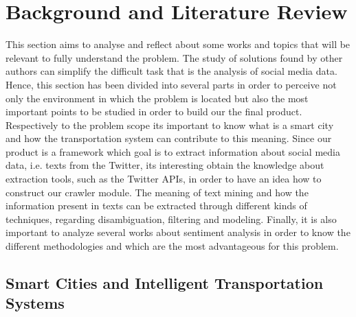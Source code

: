 \chapter{Background and Literature Review} \label{chap:sota}

\minitoc \mtcskip \noindent

This section aims to analyse and reflect about some works and topics that will be relevant to fully understand the problem. The study of solutions found by other authors can simplify the difficult task that is the analysis of social media data.
Hence, this section has been divided into several parts in order to perceive not only the environment in which the problem is located but also the most important points to be studied in order to build our the final product. Respectively to the problem scope its important to know what is a smart city and how the transportation system can contribute to this meaning. Since our product is a framework which goal is to extract information about social media data, i.e. texts from the Twitter, its interesting obtain the knowledge about extraction tools, such as the Twitter APIs, in order to have an idea how to construct our crawler module. The meaning of text mining and how the information present in texts can be extracted through different kinds of techniques, regarding disambiguation, filtering and modeling. Finally, it is also important to analyze several works about sentiment analysis in order to know the different methodologies and which are the most advantageous for this problem.

\section{Smart Cities and Intelligent Transportation Systems}\label{sec:smartcities}
